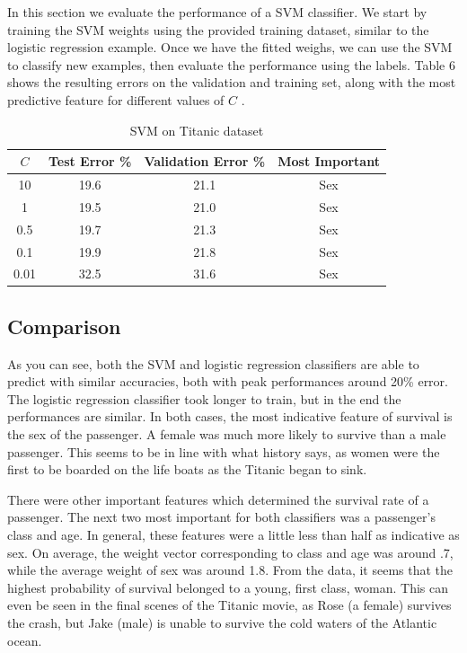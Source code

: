 \documentclass[10pt,twocolumn]{article}
\begin{document}
In this section we evaluate the performance of a SVM classifier. We start by training the SVM weights using the provided training dataset, similar to the logistic regression example. Once we have the fitted weighs, we can use the SVM to classify new examples, then evaluate the performance using the labels. Table 6 shows the resulting errors on the validation and training set, along with the most predictive feature for different values of $C$ .

\begin{table}
 \caption{SVM on Titanic dataset}
  \begin{tabular}{ | c | c | c | c |}
 \hline
 $C$ & Test Error \% & Validation Error \% & Most Important  \\ \hline 
 10 &  19.6 & 21.1 &  Sex \\ \hline
 1 & 19.5 & 21.0 & Sex  \\ \hline
 0.5 & 19.7 & 21.3 & Sex \\ \hline
 0.1 & 19.9 & 21.8 & Sex  \\ \hline 
 0.01 & 32.5 & 31.6 & Sex \\ \hline
 \end{tabular}
 \label{SVM C1 T}
\end{table}

\subsection*{Comparison}

As you can see, both the SVM and logistic regression classifiers are able to predict with similar accuracies, both with peak performances around 20\% error. The logistic regression classifier took longer to train, but in the end the performances are similar. In both cases, the most indicative feature of survival is the sex of the passenger. A female was much more likely to survive than a male passenger. This seems to be in line with what history says, as women were the first to be boarded on the life boats as the Titanic began to sink.

There were other important features which determined the survival rate of a passenger. The next two most important for both classifiers was a passenger's class and age. In general, these features were a little less than half as indicative as sex. On average, the weight vector corresponding to class and age was around .7, while the average weight of sex was around 1.8. From the data, it seems that the highest probability of survival belonged to a young, first class, woman. This can even be seen in the final scenes of the Titanic movie, as Rose (a female) survives the crash, but Jake (male) is unable to survive the cold waters of the Atlantic ocean. 
      
\end{document}
